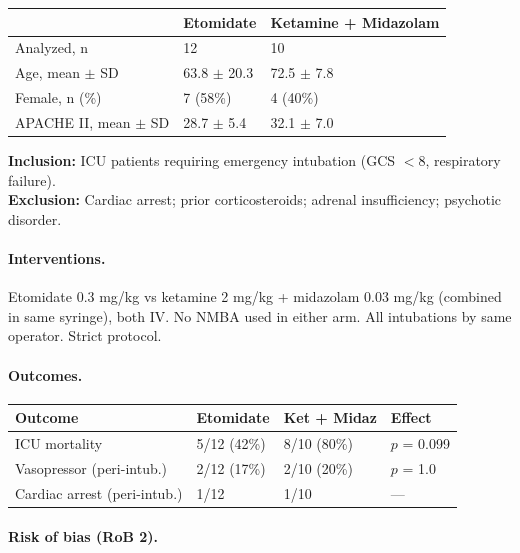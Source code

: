 \documentclass[11pt]{article}
\begin{document}
\begin{table}[H]
\centering\footnotesize
\begin{tabularx}{\textwidth}{L{4cm} C{3cm} C{3cm}}
\toprule
& \textbf{Etomidate} & \textbf{Ketamine + Midazolam} \\
\midrule
Analyzed, n & 12 & 10 \\
Age, mean $\pm$ SD & 63.8 $\pm$ 20.3 & 72.5 $\pm$ 7.8 \\
Female, n (\%) & 7 (58\%) & 4 (40\%) \\
APACHE II, mean $\pm$ SD & 28.7 $\pm$ 5.4 & 32.1 $\pm$ 7.0 \\
\bottomrule
\end{tabularx}
\end{table}

\noindent\textbf{Inclusion:} ICU patients requiring emergency intubation (GCS $<$8, respiratory failure).\\
\textbf{Exclusion:} Cardiac arrest; prior corticosteroids; adrenal insufficiency; psychotic disorder.

\paragraph{Interventions.}
Etomidate 0.3 mg/kg vs ketamine 2 mg/kg + midazolam 0.03 mg/kg (combined in same syringe), both IV. No NMBA used in either arm. All intubations by same operator. Strict protocol.

\paragraph{Outcomes.}

\begin{table}[H]
\centering\footnotesize
\begin{tabularx}{\textwidth}{L{4cm} C{2.5cm} C{2.5cm} X}
\toprule
\textbf{Outcome} & \textbf{Etomidate} & \textbf{Ket + Midaz} & \textbf{Effect} \\
\midrule
ICU mortality & 5/12 (42\%) & 8/10 (80\%) & $p$ = 0.099 \\
Vasopressor (peri-intub.) & 2/12 (17\%) & 2/10 (20\%) & $p$ = 1.0 \\
Cardiac arrest (peri-intub.) & 1/12 & 1/10 & --- \\
\bottomrule
\end{tabularx}
\end{table}

\paragraph{Risk of bias (RoB 2).}
\end{document}

